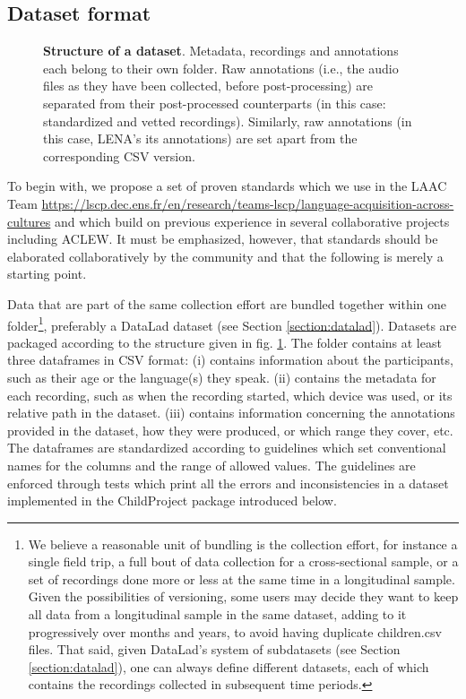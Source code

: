 \documentclass[smallextended]{svjour3}       %
\newcommand{\inputTikZ}[2]{%
     \scalebox{#1}{}
}
\begin{document}
\subsection{\label{sec:format}Dataset format}

\begin{figure}[ht]
    \centering
    \inputTikZ{0.8}{Fig2.tex}
    \caption{\textbf{Structure of a dataset}. Metadata, recordings and annotations each belong to their own folder. Raw annotations (i.e., the audio files as they have been collected, before post-processing) are separated from their post-processed counterparts (in this case: standardized and vetted recordings). Similarly, raw annotations (in this case, LENA's its annotations) are set apart from the corresponding CSV version.}
    \label{fig:tree}
\end{figure}

To begin with, we propose a set of proven standards which we use in the LAAC Team \url{https://lscp.dec.ens.fr/en/research/teams-lscp/language-acquisition-across-cultures} and which build on previous experience in several collaborative projects including ACLEW. It must be emphasized, however, that standards should be elaborated collaboratively by the community and that the following is merely a starting point.

Data that are part of the same collection effort are bundled together within one folder\footnote{We believe a reasonable unit of bundling is the collection effort, for instance a single field trip,  a full bout of data collection for a cross-sectional sample, or a set of recordings done more or less at the same time in a longitudinal sample. Given the possibilities of versioning, some users may decide they want to keep all data from a longitudinal sample in the same dataset, adding to it progressively over months and years, to avoid having duplicate children.csv files. That said, given DataLad's system of subdatasets (see Section \ref{section:datalad}), one can always define different datasets, each of which contains the recordings collected in subsequent time periods.}, preferably a DataLad dataset (see Section \ref{section:datalad}). Datasets are packaged according to the structure given in fig. \ref{fig:tree}. The  folder contains at least three dataframes in CSV format: (i)  contains information about the participants, such as their age or the language(s) they speak. (ii)  contains the metadata for each recording, such as when the recording started, which device was used, or its relative path in the dataset. (iii)  contains information concerning the annotations provided in the dataset, how they were produced, or which range they cover, etc. The dataframes are standardized according to guidelines which set conventional names for the columns and the range of allowed values. The guidelines are enforced through tests which print all the errors and inconsistencies in a dataset implemented in the ChildProject package introduced below.
\end{document}
